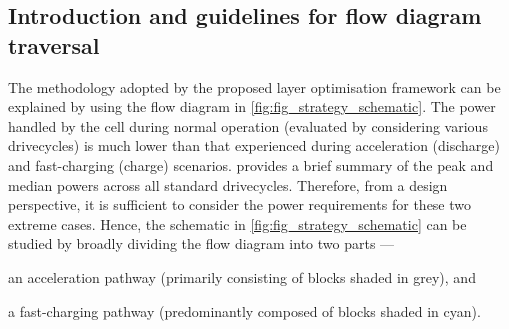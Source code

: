 

\subsection{Introduction and guidelines for flow diagram traversal}

The  methodology adopted  by the  proposed layer  optimisation framework  can be
explained by  using the  flow diagram in  \cref{fig:fig_strategy_schematic}. The
power  handled by  the cell  during normal  operation (evaluated  by considering
various drivecycles)  is much  lower than  that experienced  during acceleration
(discharge)  and  fast-charging (charge)  scenarios.  
provides  a brief  summary of  the peak  and median  powers across  all standard
drivecycles. Therefore, from a design  perspective, it is sufficient to consider
the power  requirements for  these two  extreme cases.  Hence, the  schematic in
\cref{fig:fig_strategy_schematic} can  be studied  by broadly dividing  the flow
diagram into two parts ---
\begin{enumerate*}[label=\roman*)]
    \item an acceleration pathway (primarily consisting of blocks shaded in grey), and
    \item a fast-charging pathway (predominantly composed of blocks shaded in cyan).
\end{enumerate*}

